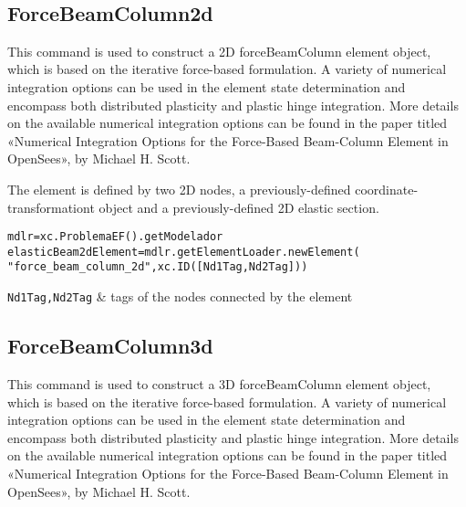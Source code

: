 \begin{methodsTable}
\ElementMeth{}
\ElementOneDMeth{}
\getVDirEjeFuerteLocales{} \\
\getVDirEjeDebilLocales{} \\
\getAnguloEjeFuerte{} \\
\getAnguloEjeDebil{} \\
\getVDirEjeFuerteGlobales{} \\
\getVDirEjeDebilGlobales{} \\

\end{methodsTable}

\subsection{ForceBeamColumn2d}
This command is used to construct a 2D forceBeamColumn element object, which is based on the iterative force-based formulation. A variety of numerical integration options can be used in the element state determination and encompass both distributed plasticity and plastic hinge integration. More details on the available numerical integration options can be found in the paper titled «Numerical Integration Options for the Force-Based Beam-Column Element in OpenSees», by Michael H. Scott.

The element is defined by two 2D nodes, a previously-defined coordinate-transformationt object and a previously-defined 2D elastic section.
\begin{verbatim}
mdlr=xc.ProblemaEF().getModelador
elasticBeam2dElement=mdlr.getElementLoader.newElement(
"force_beam_column_2d",xc.ID([Nd1Tag,Nd2Tag]))
\end{verbatim}
\begin{paramFuncTable}
{\tt Nd1Tag,Nd2Tag} & tags of the nodes connected by the element\\
\end{paramFuncTable}

\begin{paramClassTable}
\ElementParam{}
\ElementOneDParam{}
\rhoX{}
\end{paramClassTable}

\begin{methodsTable}
\ElementMeth{}
\ElementOneDMeth{}
\BeamColumnWithSectionFDMeth{}
\end{methodsTable}

\subsection{ForceBeamColumn3d}
This command is used to construct a 3D forceBeamColumn element object, which is based on the iterative force-based formulation. A variety of numerical integration options can be used in the element state determination and encompass both distributed plasticity and plastic hinge integration. More details on the available numerical integration options can be found in the paper titled «Numerical Integration Options for the Force-Based Beam-Column Element in OpenSees», by Michael H. Scott. 

